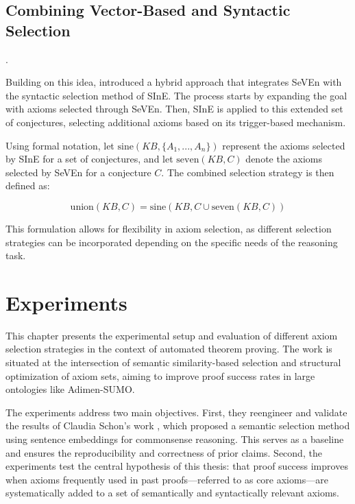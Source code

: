 \documentclass[english,version-2020-11]{uzl-thesis}
\begin{document}
\section{Combining Vector-Based and Syntactic Selection}.

Building on this idea, \cite{Schon2023} introduced a hybrid approach that integrates SeVEn with the syntactic selection method of SInE. The process starts by expanding the goal with axioms selected through SeVEn. Then, SInE is applied to this extended set of conjectures, selecting additional axioms based on its trigger-based mechanism. 

Using formal notation, let \( \text{sine}(KB, \{A_1, ..., A_n\}) \) represent the axioms selected by SInE for a set of conjectures, and let \( \text{seven}(KB, C) \) denote the axioms selected by SeVEn for a conjecture \( C \). The combined selection strategy is then defined as:

\begin{definition}
    \begin{equation}
        \text{union}(KB, C) = \text{sine}(KB, C \cup \text{seven}(KB, C))
    \end{equation}
\end{definition}

This formulation allows for flexibility in axiom selection, as different selection strategies can be incorporated depending on the specific needs of the reasoning task.


\chapter{Experiments}
\label{chapter-experiments}

This chapter presents the experimental setup and evaluation of different axiom selection strategies in the context of automated theorem proving. The work is situated at the intersection of semantic similarity-based selection and structural optimization of axiom sets, aiming to improve proof success rates in large ontologies like Adimen-SUMO.

The experiments address two main objectives. First, they reengineer and validate the results of Claudia Schon's work \cite{Schon2024}, which proposed a semantic selection method using sentence embeddings for commonsense reasoning. This serves as a baseline and ensures the reproducibility and correctness of prior claims. Second, the experiments test the central hypothesis of this thesis: that proof success improves when axioms frequently used in past proofs—referred to as core axioms—are systematically added to a set of semantically and syntactically relevant axioms.
\end{document}
